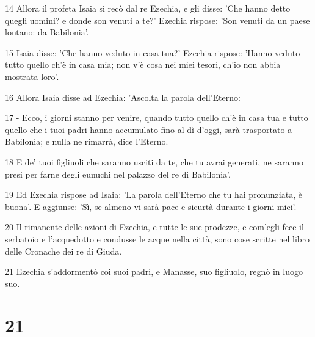 \par 14 Allora il profeta Isaia si recò dal re Ezechia, e gli disse: 'Che hanno detto quegli uomini? e donde son venuti a te?' Ezechia rispose: 'Son venuti da un paese lontano: da Babilonia'.
\par 15 Isaia disse: 'Che hanno veduto in casa tua?' Ezechia rispose: 'Hanno veduto tutto quello ch'è in casa mia; non v'è cosa nei miei tesori, ch'io non abbia mostrata loro'.
\par 16 Allora Isaia disse ad Ezechia: 'Ascolta la parola dell'Eterno:
\par 17 - Ecco, i giorni stanno per venire, quando tutto quello ch'è in casa tua e tutto quello che i tuoi padri hanno accumulato fino al dì d'oggi, sarà trasportato a Babilonia; e nulla ne rimarrà, dice l'Eterno.
\par 18 E de' tuoi figliuoli che saranno usciti da te, che tu avrai generati, ne saranno presi per farne degli eunuchi nel palazzo del re di Babilonia'.
\par 19 Ed Ezechia rispose ad Isaia: 'La parola dell'Eterno che tu hai pronunziata, è buona'. E aggiunse: 'Sì, se almeno vi sarà pace e sicurtà durante i giorni miei'.
\par 20 Il rimanente delle azioni di Ezechia, e tutte le sue prodezze, e com'egli fece il serbatoio e l'acquedotto e condusse le acque nella città, sono cose scritte nel libro delle Cronache dei re di Giuda.
\par 21 Ezechia s'addormentò coi suoi padri, e Manasse, suo figliuolo, regnò in luogo suo.

\chapter{21}

